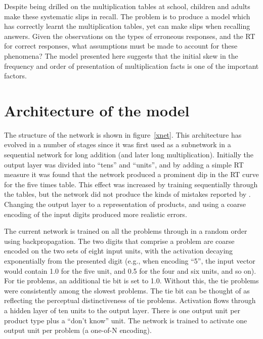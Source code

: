 Despite being drilled on the multiplication tables at school, children and
adults make these systematic slips in recall. The problem is to produce a
model which has correctly learnt the multiplication tables, yet can make
slips when recalling answers. Given the observations on the types of
erroneous responses, and the RT for correct responses, what assumptions
must be made to account for these phenomena? The model presented here
suggests that the initial skew in the frequency and order of presentation
of multiplication facts \cite[p.~118]{camprole} is one of the important
factors.

\section*{Architecture of the model}



The structure of the network is shown in figure~\ref{xnet}.  This
architecture has evolved in a number of stages since it was first used as a
subnetwork in a sequential network for long addition (and later long
multiplication).  Initially the output layer was divided into ``tens'' and
``units'', and by adding a simple RT measure it was found that the network
produced a prominent dip in the RT curve for the five times table.  This
effect was increased by training sequentially through the tables, but the
network did not produce the kinds of mistakes reported by .
Changing the output layer to a representation of products, and using a
coarse encoding of the input digits produced more realistic errors.


The current network is trained on all the problems  through  in a
random order using backpropagation. %
%
The two digits that comprise a problem are coarse encoded on the two sets
of eight input units, with the activation decaying exponentially from the
presented digit (e.g., when encoding ``5'', the input vector would contain
1.0 for the five unit, and 0.5 for the four and six units, and so on). For
tie problems, an additional tie bit is set to 1.0. Without this, the tie
problems were consistently among the slowest problems. The tie bit can be
thought of as reflecting the perceptual distinctiveness of tie problems.
Activation flows through a hidden layer of ten units to the output layer.
There is one output unit per product type plus a ``don't know'' unit.  The
network is trained to activate one output unit per problem (a one-of-N
encoding).


